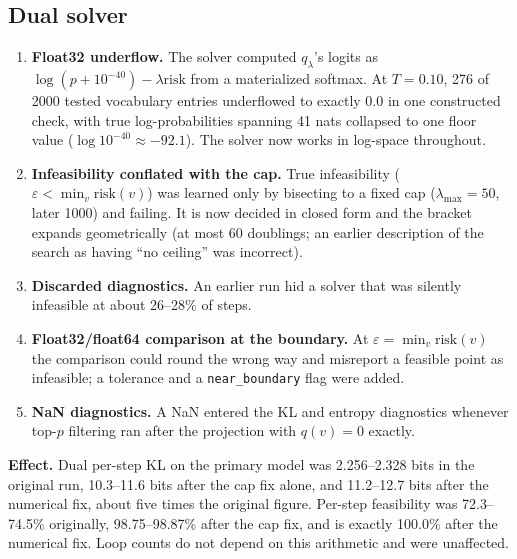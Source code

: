 \documentclass[make,article,submit,pdftex]{Definitions/mdpi}
\newcommand{\risk}{\mathrm{risk}}
\begin{document}
\subsection*{Dual solver}
\begin{enumerate}[leftmargin=*]
  \item \textbf{Float32 underflow.} The solver computed $q_\lambda$'s logits as $\log(p+10^{-40})-\lambda\risk$ from a materialized softmax. At $T{=}0.10$, 276 of 2000 tested vocabulary entries underflowed to exactly $0.0$ in one constructed check, with true log-probabilities spanning 41 nats collapsed to one floor value ($\log10^{-40}\approx-92.1$). The solver now works in log-space throughout.
  \item \textbf{Infeasibility conflated with the cap.} True infeasibility ($\varepsilon<\min_v\risk(v)$) was learned only by bisecting to a fixed cap ($\lambda_{\max}{=}50$, later 1000) and failing. It is now decided in closed form and the bracket expands geometrically (at most 60 doublings; an earlier description of the search as having ``no ceiling'' was incorrect).
  \item \textbf{Discarded diagnostics.} An earlier run hid a solver that was silently infeasible at about 26--28\% of steps.
  \item \textbf{Float32/float64 comparison at the boundary.} At $\varepsilon=\min_v\risk(v)$ the comparison could round the wrong way and misreport a feasible point as infeasible; a tolerance and a \texttt{near\_\allowbreak{}boundary} flag were added.
  \item \textbf{NaN diagnostics.} A NaN entered the KL and entropy diagnostics whenever top-$p$ filtering ran after the projection with $q(v){=}0$ exactly.
\end{enumerate}
\textbf{Effect.} Dual per-step KL on the primary model was 2.256--2.328 bits in the original run, 10.3--11.6 bits after the cap fix alone, and 11.2--12.7 bits after the numerical fix, about five times the original figure. Per-step feasibility was 72.3--74.5\% originally, 98.75--98.87\% after the cap fix, and is exactly 100.0\% after the numerical fix. Loop counts do not depend on this arithmetic and were unaffected.
\end{document}
